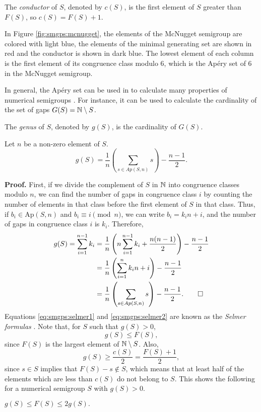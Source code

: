 \begin{definition}
    The \textit{conductor} of $S$, denoted by $c(S)$, is the first element of $S$ greater than $F(S)$, so $c(S) = F(S) + 1$.
\end{definition}
In Figure \ref{fig:smgps:mcnugget}, the elements of the McNugget semigroup are colored with light blue, the elements of the minimal generating set are shown in red and the conductor is shown in dark blue. The lowest element of each column is the first element of its congruence class modulo 6, which is the Apéry set of 6 in the McNugget semigroup. \par

In general, the Apéry set can be used in to calculate many properties of numerical semigroups \cite{apery1946branches}. For instance, it can be used to calculate the cardinality of the set of gaps $G(S) = \mathbb{N} \setminus S$.

\begin{definition}\label{def:smgps:genus}
    The \textit{genus} of $S$, denoted by $g(S)$, is the cardinality of $G(S)$.
\end{definition}

\begin{proposition} Let $n$ be a non-zero element of $S$. 
    \begin{equation}\label{eq:smgps:selmer2}
        g(S) = \frac{1}{n}\left(\sum_{s \in Ap(S, n)} s\right) - \frac{n - 1}{2}.
    \end{equation}
\end{proposition}
\textbf{Proof. } First, if we divide the complement of $S$ in $\mathbb{N}$ into congruence classes modulo $n$, we can find the number of gaps in congruence class $i$ by counting the number of elements in that class before the first element of $S$ in that class. Thus, if $b_i \in \mathrm{Ap}(S, n)$ and $b_i \equiv i \pmod n$, we can write $b_i = k_i n + i$, and the number of gaps in congruence class $i$ is $k_i$. Therefore,
\begin{align*}
    g(S) = \sum_{i = 1}^{n - 1} k_i &=  \frac{1}{n}\left(n\sum_{i = 1}^{n - 1} k_i + \frac{n(n - 1)}{2}\right) - \frac{n - 1}{2} \\
    &= \frac{1}{n}\left(\sum_{i = 1}^n k_i n + i \right) - \frac{n - 1}{2} \\
    &= \frac{1}{n}\left(\sum_{s \in Ap(S, n)} s \right) - \frac{n - 1}{2}. \qed
\end{align*}
Equations \ref{eq:smgps:selmer1} and \ref{eq:smgps:selmer2} are known as the \textit{Selmer formulas} \cite{selmer1977linear}. Note that, for $S$ such that $g(S) > 0$,
\[g(S) \leq F(S),\] 
since $F(S)$ is the largest element of $\mathbb{N} \setminus S$. Also, 
\[g(S) \geq \frac{c(S)}{2} = \frac{F(S) + 1}{2},\]
since $s \in S$ implies that $F(S) - s \notin S$, which means that at least half of the elements which are less than $c(S)$ do not belong to $S$.  This shows the following for a numerical semigroup $S$ with $g(S) > 0$. 
\begin{proposition}\label{prop:smgps:frobgenus}
    \(g(S) \leq F(S) \leq 2g(S).\)
\end{proposition}


